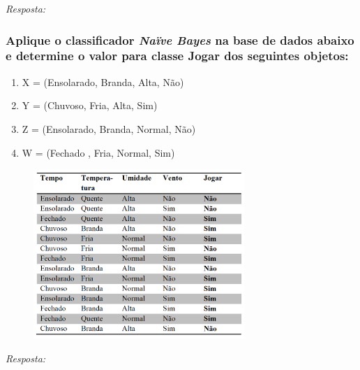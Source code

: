 \documentclass{article}
\begin{document}
\textit{Resposta:} 

\subsubsection{Aplique o classificador \textit{Naïve Bayes} na base de dados abaixo e determine o valor para classe \textbf{Jogar} dos seguintes objetos:}
\begin{enumerate}[label=\alph*]
    \item X = (Ensolarado, Branda, Alta, Não)
    \item Y = (Chuvoso, Fria, Alta, Sim)
    \item Z = (Ensolarado, Branda, Normal, Não)
    \item W = (Fechado , Fria, Normal, Sim)
\end{enumerate}

\begin{figure}[H]
    \centering 
    \includegraphics[width=8cm]{tab-5-2-4.png} 
  \end{figure}

\textit{Resposta:} 
\end{document}
